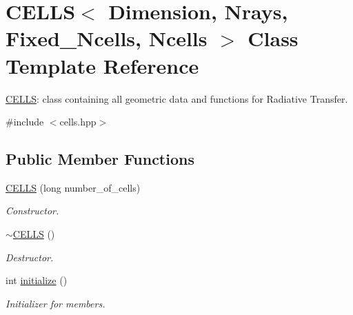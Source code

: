 \hypertarget{classCELLS}{}\section{C\+E\+L\+LS$<$ Dimension, Nrays, Fixed\+\_\+\+Ncells, Ncells $>$ Class Template Reference}
\label{classCELLS}


\mbox{\hyperlink{classCELLS}{C\+E\+L\+LS}}\+: class containing all geometric data and functions for Radiative Transfer.  




{\ttfamily \#include $<$cells.\+hpp$>$}

\subsection*{Public Member Functions}
\begin{DoxyCompactItemize}
\item 
\mbox{\label{classCELLS_a7e1879048b54a1e0c7be7d97c655fb3e}} 
\mbox{\hyperlink{classCELLS_a7e1879048b54a1e0c7be7d97c655fb3e}{C\+E\+L\+LS}} (long number\+\_\+of\+\_\+cells)
\begin{DoxyCompactList}\small\item\em Constructor. \end{DoxyCompactList}\item 
\mbox{\label{classCELLS_a56d69b799369f91db8c5d7946acf71ee}} 
\mbox{\hyperlink{classCELLS_a56d69b799369f91db8c5d7946acf71ee}{$\sim$\+C\+E\+L\+LS}} ()
\begin{DoxyCompactList}\small\item\em Destructor. \end{DoxyCompactList}\item 
\mbox{\label{classCELLS_a1913eb5085755acf39d63cba740e0b3a}} 
int \mbox{\hyperlink{classCELLS_a1913eb5085755acf39d63cba740e0b3a}{initialize}} ()
\begin{DoxyCompactList}\small\item\em Initializer for members. \end{DoxyCompactList}\end{DoxyCompactItemize}
